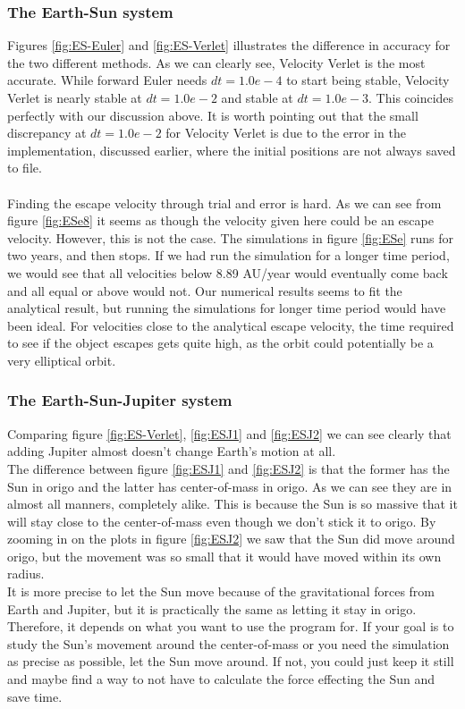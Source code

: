 \documentclass{article}
\begin{document}
\subsubsection{The Earth-Sun system}
Figures \ref{fig:ES-Euler} and \ref{fig:ES-Verlet} illustrates the difference in accuracy for the two different methods. As we can clearly see, Velocity Verlet is the most accurate. While forward Euler needs $dt = 1.0e-4$ to start being stable, Velocity Verlet is nearly stable at $dt = 1.0e-2$ and stable at $dt = 1.0e-3$. This coincides perfectly with our discussion above. It is worth pointing out that the small discrepancy at $dt = 1.0e-2$ for Velocity Verlet is due to the error in the implementation, discussed earlier, where the initial positions are not always saved to file.\\ \\
Finding the escape velocity through trial and error is hard. As we can see from figure \ref{fig:ESe8} it seems as though the velocity given here could be an escape velocity. However, this is not the case. The simulations in figure \ref{fig:ESe} runs for two years, and then stops. If we had run the simulation for a longer time period, we would see that all velocities below 8.89 AU/year would eventually come back and all equal or above would not. Our numerical results seems to fit the analytical result, but running the simulations for longer time period would have been ideal. For velocities close to the analytical escape velocity, the time required to see if the object escapes gets quite high, as the orbit could potentially be a very elliptical orbit.%
\subsubsection{The Earth-Sun-Jupiter system}
Comparing figure \ref{fig:ES-Verlet}, \ref{fig:ESJ1} and \ref{fig:ESJ2} we can see clearly that adding Jupiter almost doesn't change Earth's motion at all. \\
The difference between figure \ref{fig:ESJ1} and \ref{fig:ESJ2} is that the former has the Sun in origo and the latter has center-of-mass in origo. As we can see they are in almost all manners, completely alike. This is because the Sun is so massive that it will stay close to the center-of-mass even though we don't stick it to origo. By zooming in on the plots in figure \ref{fig:ESJ2} we saw that the Sun did move around origo, but the movement was so small that it would have moved within its own radius.\\
 It is more precise to let the Sun move because of the gravitational forces from Earth and Jupiter, but it is practically the same as letting it stay in origo. Therefore, it depends on what you want to use the program for. If your goal is to study the Sun's movement around the center-of-mass or you need the simulation as precise as possible, let the Sun move around. If not, you could just keep it still and maybe find a way to not have to calculate the force effecting the Sun and save time. \\
\end{document}
